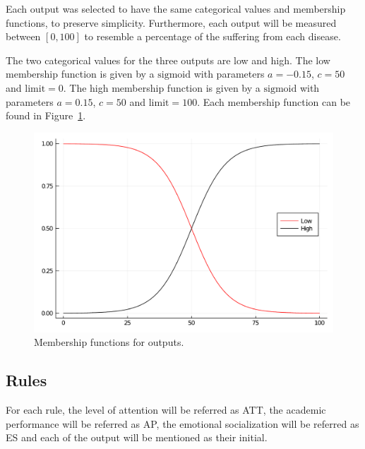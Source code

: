 \documentclass[conference]{IEEEtran}
\theoremstyle{definition}
\theoremstyle{remark}
\theoremstyle{remark}
\begin{document}
Each output was selected to have the same categorical values and membership
functions, to preserve simplicity. Furthermore, each output will be measured
between $[0, 100]$ to resemble a percentage of the suffering from each disease.

The two categorical values for the three outputs are low and high. The low
membership function is given by a $\mathrm{sigmoid}$ with parameters $a=-0.15$,
$c=50$ and $\mathrm{limit} = 0$. The high membership function is given by a
$\mathrm{sigmoid}$ with parameters $a=0.15$, $c=50$ and $\mathrm{limit} = 100$.
Each membership function can be found in Figure~\ref{fig:out_mf}.

\begin{figure}[t]
  \centering
  \includegraphics[scale=.3]{figs/outputs.pdf}
  \caption{Membership functions for outputs.}
  \label{fig:out_mf}
\end{figure}

\subsection{Rules}
For each rule, the level of attention will be referred as ATT, the academic
performance will be referred as AP, the emotional socialization will be referred
as ES and each of the output will be mentioned as their initial.
\end{document}
